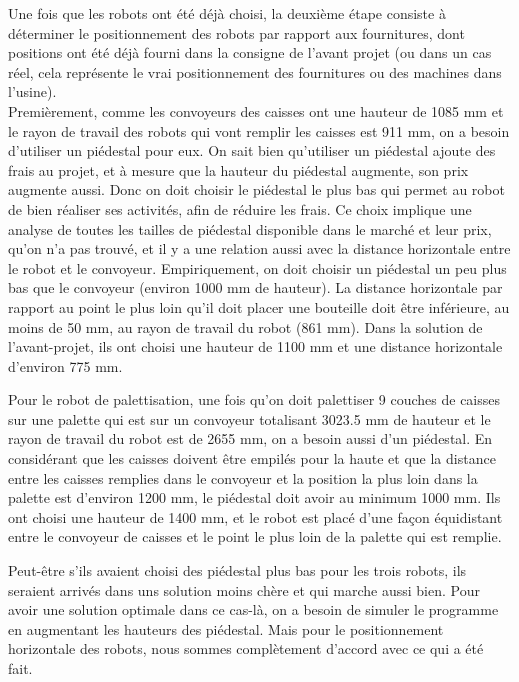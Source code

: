 Une fois que les robots ont été déjà choisi, la deuxième étape consiste à déterminer le positionnement des robots par rapport aux fournitures, dont positions ont été déjà fourni dans la consigne de l’avant projet (ou dans un cas réel, cela représente le vrai positionnement des fournitures ou des machines dans l’usine).\\

Premièrement, comme les convoyeurs des caisses ont une hauteur de 1085 mm et le rayon de travail des robots qui vont remplir les caisses est 911 mm, on a besoin d’utiliser un piédestal pour eux. On sait bien qu’utiliser un piédestal ajoute des frais au projet, et à mesure que la hauteur du piédestal augmente, son prix augmente aussi. Donc on doit choisir le piédestal le plus bas qui permet au robot de bien réaliser ses activités, afin de réduire les frais. Ce choix implique une analyse de toutes les tailles de piédestal disponible dans le marché et leur prix, qu’on n’a pas trouvé, et il y a une relation aussi avec la distance horizontale entre le robot et le convoyeur. Empiriquement, on doit choisir un piédestal un peu plus bas que le convoyeur (environ 1000 mm de hauteur). La distance horizontale par rapport au point le plus loin qu’il doit placer une bouteille doit être inférieure, au moins de 50 mm, au rayon de travail du robot (861 mm). Dans la solution de l’avant-projet, ils ont choisi une hauteur de 1100 mm et une distance horizontale d’environ 775 mm. 

Pour le robot de palettisation, une fois qu’on doit palettiser 9 couches de caisses sur une palette qui est sur un convoyeur totalisant 3023.5 mm de hauteur et le rayon de travail du robot est de 2655 mm, on a besoin aussi d’un piédestal. En considérant que les caisses doivent être empilés pour la haute et que la distance entre les caisses remplies dans le convoyeur et la position la plus loin dans la palette est d’environ 1200 mm, le piédestal doit avoir au minimum 1000 mm. Ils ont choisi une hauteur de 1400 mm, et le robot est placé d’une façon équidistant entre le convoyeur de caisses et le point le plus loin de la palette qui est remplie. 

Peut-être s’ils avaient choisi des piédestal plus bas pour les trois robots, ils seraient arrivés dans uns solution moins chère et qui marche aussi bien. Pour avoir une solution optimale dans ce cas-là, on a besoin de simuler le programme en augmentant les hauteurs des piédestal. Mais pour le positionnement horizontale des robots, nous sommes complètement d’accord avec ce qui a été fait.

